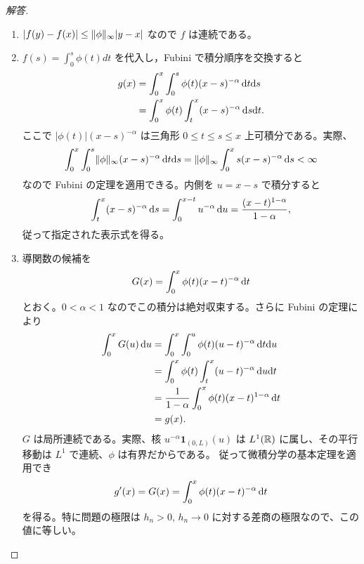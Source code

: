 \begin{proof}[解答]
\begin{enumerate}
\item[(1)] $|f(y)-f(x)|\le\lVert \phi \rVert_\infty|y-x|$ なので $f$ は連続である。
\item[(2)]$f(s)=\int_0^s\phi(t)dt$ を代入し，Fubini で積分順序を交換すると
\begin{align*}
g(x)
&=\int_0^x\int_0^s\phi(t)(x-s)^{-\alpha}\,\mathrm{d} t\mathrm{d} s\\
&=\int_0^x\phi(t)\int_t^x(x-s)^{-\alpha}\,\mathrm{d} s\mathrm{d} t.
\end{align*}
ここで $|\phi(t)|(x-s)^{-\alpha}$ は三角形 $0\le t\le s\le x$ 上可積分である。実際、
\[
\int_0^x\int_0^s\lVert \phi \rVert_\infty(x-s)^{-\alpha}\,\mathrm{d} t\mathrm{d} s
=\lVert \phi \rVert_\infty\int_0^x s(x-s)^{-\alpha}\,\mathrm{d} s<\infty
\]
なので Fubini の定理を適用できる。内側を $u=x-s$ で積分すると
\[
\int_t^x(x-s)^{-\alpha}\,\mathrm{d} s
=\int_0^{x-t}u^{-\alpha}\,\mathrm{d} u
=\frac{(x-t)^{1-\alpha}}{1-\alpha},
\]
従って指定された表示式を得る。

\item[(3)] 導関数の候補を
\[
G(x)=\int_0^x\phi(t)(x-t)^{-\alpha}\,\mathrm{d} t
\]
とおく。$0<\alpha<1$ なのでこの積分は絶対収束する。さらに Fubini の定理により
\begin{align*}
\int_0^xG(u)\,\mathrm{d} u
&=\int_0^x\int_0^u\phi(t)(u-t)^{-\alpha}\,\mathrm{d} t\mathrm{d} u\\
&=\int_0^x\phi(t)\int_t^x(u-t)^{-\alpha}\,\mathrm{d} u\mathrm{d} t\\
&=\frac1{1-\alpha}\int_0^x\phi(t)(x-t)^{1-\alpha}\,\mathrm{d} t\\
&=g(x).
\end{align*}
$G$ は局所連続である。実際、核 $u^{-\alpha}\mathbf1_{(0,L)}(u)$ は
$L^1(\mathbb{R})$ に属し、その平行移動は $L^1$ で連続、$\phi$ は有界だからである。
従って微積分学の基本定理を適用でき
\[
g'(x)=G(x)=\int_0^x\phi(t)(x-t)^{-\alpha}\,\mathrm{d} t
\]
を得る。特に問題の極限は $h_n>0$, $h_n\to0$ に対する差商の極限なので、この値に等しい。
\end{enumerate}
\end{proof}
